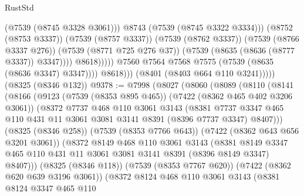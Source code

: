 \begin{lexlean}{RustStd}
\begin{coremodule}
                                      (@7539 (@8745 @3328 @3061)))
                                    @8743
                                    (@7539 (@8745 @3322 @3334)))
                                  (@8752 (@8753 @3337))
                                  (@7539 (@8757 @3337))
                                  (@7539 (@8762 @3337))
                                  (@7539 (@8766 @3337 @276))
                                  (@7539 (@8771 @725 @276 @37))
                                  (@7539 (@8635 (@8636 (@8777 @3337)) @3347))))
                              @8618)))))
                    @7560
                    @7564
                    @7568
                    @7575
                    (@7539 (@8635 (@8636 @3347) @3347))))
                @8618)))
          (@8401 (@8403 @664 @110 @3241)))))
    (@8325 (@8346 @132))
@9378 := @7998
    (@8027
      (@8060
        (@8089
          (@8110
            (@8141
              (@8166
                (@9123
                  (@7539 (@8353 @895 @465))
                  (@7422 (@8362 @465 @402 @3206 @3061))
                  (@8372
                    @7737
                    @468
                    @110
                    @3061
                    @3143
                    (@8381
                      @7737
                      @3347
                      @465
                      @110
                      @431
                      @11
                      @3061
                      @3081
                      @3141
                      @8391
                      (@8396 @7737 @3347)
                      @8407)))
                (@8325 (@8346 @258))
                (@7539 (@8353 @7766 @643))
                (@7422 (@8362 @643 @656 @3201 @3061))
                (@8372
                  @8149
                  @468
                  @110
                  @3061
                  @3143
                  (@8381
                    @8149
                    @3347
                    @465
                    @110
                    @431
                    @11
                    @3061
                    @3081
                    @3141
                    @8391
                    (@8396 @8149 @3347)
                    @8407)))
              (@8325 (@8346 @118))
              (@7539 (@8353 @7767 @620))
              (@7422 (@8362 @620 @639 @3196 @3061))
              (@8372
                @8124
                @468
                @110
                @3061
                @3143
                (@8381
                  @8124
                  @3347
                  @465
                  @110

\end{coremodule}
\end{lexlean}
